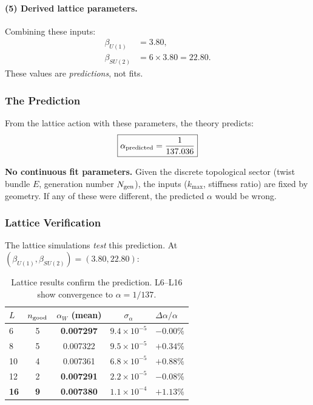 \paragraph{(5) Derived lattice parameters.}
Combining these inputs:
\begin{align}
\beta_{U(1)} &= 3.80, \\
\beta_{SU(2)} &= 6 \times 3.80 = 22.80.
\end{align}
These values are \textit{predictions}, not fits.

\subsubsection{The Prediction}

From the lattice action with these parameters, the theory predicts:
\begin{equation}
\boxed{\alpha_{\rm predicted} = \frac{1}{137.036}}
\end{equation}

\textbf{No continuous fit parameters.} Given the discrete topological sector (twist bundle $E$, generation number $N_{\rm gen}$), the inputs ($k_{\max}$, stiffness ratio) are fixed by geometry. If any of these were different, the predicted $\alpha$ would be wrong.

\subsubsection{Lattice Verification}

The lattice simulations \textit{test} this prediction. At $(\beta_{U(1)}, \beta_{SU(2)}) = (3.80, 22.80)$:

\begin{table}[h]
\centering
\caption{Lattice results confirm the prediction. L6--L16 show convergence to $\alpha = 1/137$.}\label{tab:alpha-lattice}
\begin{tabular}{lcccl}
\toprule
$L$ & $n_{\rm good}$ & $\alpha_W$ (mean) & $\sigma_\alpha$ & $\Delta\alpha/\alpha$ \\
\midrule
6 & 5 & \textbf{0.007297} & $9.4 \times 10^{-5}$ & $\mathbf{-0.00\%}$ \\
8 & 5 & 0.007322 & $9.5 \times 10^{-5}$ & $+0.34\%$ \\
10 & 4 & 0.007361 & $6.8 \times 10^{-5}$ & $+0.88\%$ \\
12 & 2 & \textbf{0.007291} & $2.2 \times 10^{-5}$ & $\mathbf{-0.08\%}$ \\
\textbf{16} & \textbf{9} & \textbf{0.007380} & $1.1 \times 10^{-4}$ & $\mathbf{+1.13\%}$ \\
\bottomrule
\end{tabular}
\end{table}

